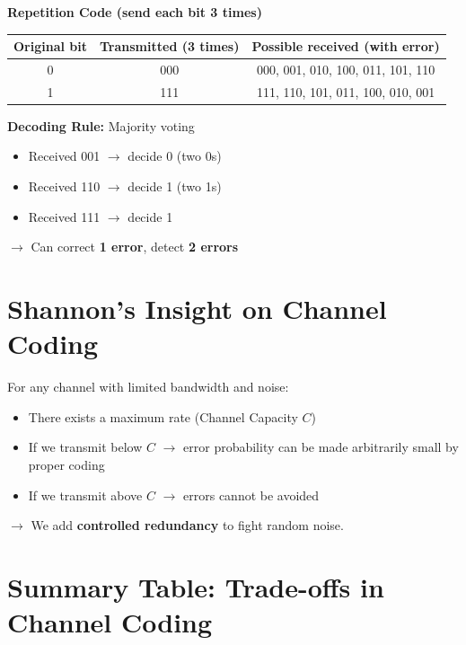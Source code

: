\documentclass[11pt,a4paper]{book}
\newenvironment{infobox}[1][Information]{
    \begin{tcolorbox}[
        enhanced,
        breakable,
        colback=mintgreen!10,
        colframe=mintgreen!200,
        title=#1,
        fonttitle=\bfseries,
        sharp corners,
        boxrule=0.8pt,
        left=8pt,
        right=8pt,
        top=6pt,
        bottom=6pt
    ]
}{
    \end{tcolorbox}
}
\newcounter{qna}[chapter]
\renewcommand{\theqna}{\thechapter.\arabic{qna}}
\newenvironment{questionanswerbox}{
    \refstepcounter{qna}%
    \begin{tcolorbox}[
        enhanced,
        breakable,
        colback=softlavender!10,
        colframe=softlavender!200,
        title={Example~\theqna}, %
        fonttitle=\bfseries,
        coltitle=white,
        colbacktitle=softlavender!200,
        sharp corners,
        boxrule=1pt,
        left=8pt,
        right=8pt,
        top=6pt,
        bottom=6pt
    ]
}{
    \end{tcolorbox}
}
\begin{document}
\begin{questionanswerbox}
    \textbf{Repetition Code (send each bit 3 times)}
    \begin{center}
        \begin{tabular}{c|c|c}
            Original bit & Transmitted (3 times) & Possible received (with error)    \\ \hline
            0            & 000                   & 000, 001, 010, 100, 011, 101, 110 \\
            1            & 111                   & 111, 110, 101, 011, 100, 010, 001
        \end{tabular}
    \end{center}
    \textbf{Decoding Rule:} Majority voting
    \begin{itemize}
        \item Received 001 $\to$ decide 0 (two 0s)
        \item Received 110 $\to$ decide 1 (two 1s)
        \item Received 111 $\to$ decide 1
    \end{itemize}
    $\to$ Can correct \textbf{1 error}, detect \textbf{2 errors}
\end{questionanswerbox}

\section{Shannon's Insight on Channel Coding}

\begin{infobox}[Shannon's Channel Coding Theorem (Intuitive)]
    For any channel with limited bandwidth and noise:
    \begin{itemize}
        \item There exists a maximum rate (Channel Capacity $C$)
        \item If we transmit below $C$ $\to$ error probability can be made arbitrarily small by proper coding
        \item If we transmit above $C$ $\to$ errors cannot be avoided
    \end{itemize}
    $\to$ We add \textbf{controlled redundancy} to fight random noise.
\end{infobox}

\section{Summary Table: Trade-offs in Channel Coding}
\end{document}
